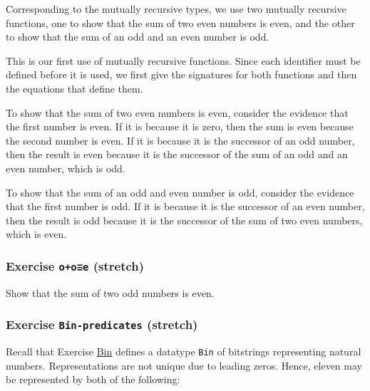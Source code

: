 Corresponding to the mutually recursive types, we use two mutually
recursive functions, one to show that the sum of two even numbers is
even, and the other to show that the sum of an odd and an even number is
odd.

This is our first use of mutually recursive functions. Since each
identifier must be defined before it is used, we first give the
signatures for both functions and then the equations that define them.

To show that the sum of two even numbers is even, consider the evidence
that the first number is even. If it is because it is zero, then the sum
is even because the second number is even. If it is because it is the
successor of an odd number, then the result is even because it is the
successor of the sum of an odd and an even number, which is odd.

To show that the sum of an odd and even number is odd, consider the
evidence that the first number is odd. If it is because it is the
successor of an even number, then the result is odd because it is the
successor of the sum of two even numbers, which is even.

\hypertarget{Relations-odd-plus-odd}{%
\subsubsection{\texorpdfstring{Exercise \texttt{o+o≡e}
(stretch)}{Exercise o+o≡e (stretch)}}\label{Relations-odd-plus-odd}}

Show that the sum of two odd numbers is even.

\begin{fence}
\begin{code}%
\>[0]\<%
\end{code}
\end{fence}

\hypertarget{Relations-Bin-predicates}{%
\subsubsection{\texorpdfstring{Exercise \texttt{Bin-predicates}
(stretch)}{Exercise Bin-predicates (stretch)}}\label{Relations-Bin-predicates}}

Recall that Exercise \protect\hyperlink{Naturals-Bin}{Bin} defines a
datatype \texttt{Bin} of bitstrings representing natural numbers.
Representations are not unique due to leading zeros. Hence, eleven may
be represented by both of the following:

